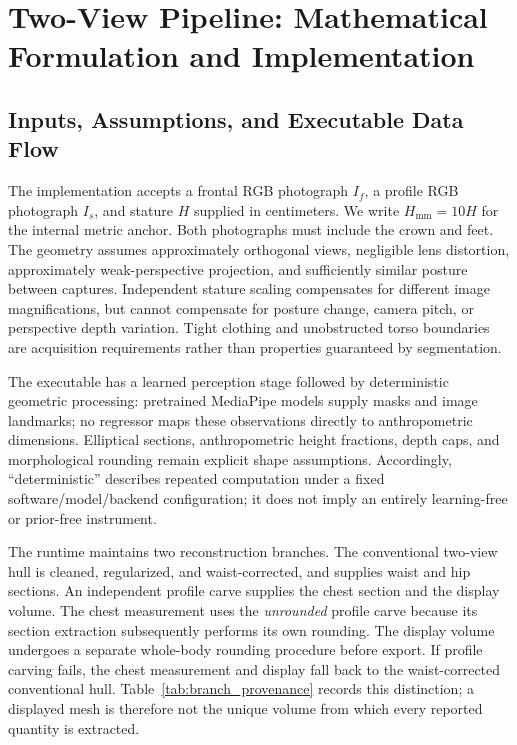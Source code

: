 \section{Two-View Pipeline: Mathematical Formulation and Implementation}
\label{sec:system_pipeline}

\subsection{Inputs, Assumptions, and Executable Data Flow}
The implementation accepts a frontal RGB photograph $I_f$, a profile RGB photograph $I_s$, and stature $H$ supplied in centimeters. We write $H_{\mathrm{mm}}=10H$ for the internal metric anchor. Both photographs must include the crown and feet. The geometry assumes approximately orthogonal views, negligible lens distortion, approximately weak-perspective projection, and sufficiently similar posture between captures. Independent stature scaling compensates for different image magnifications, but cannot compensate for posture change, camera pitch, or perspective depth variation. Tight clothing and unobstructed torso boundaries are acquisition requirements rather than properties guaranteed by segmentation.

The executable has a learned perception stage followed by deterministic geometric processing: pretrained MediaPipe models supply masks and image landmarks; no regressor maps these observations directly to anthropometric dimensions. Elliptical sections, anthropometric height fractions, depth caps, and morphological rounding remain explicit shape assumptions. Accordingly, ``deterministic'' describes repeated computation under a fixed software/model/backend configuration; it does not imply an entirely learning-free or prior-free instrument.

The runtime maintains two reconstruction branches. The conventional two-view hull is cleaned, regularized, and waist-corrected, and supplies waist and hip sections. An independent profile carve supplies the chest section and the display volume. The chest measurement uses the \emph{unrounded} profile carve because its section extraction subsequently performs its own rounding. The display volume undergoes a separate whole-body rounding procedure before export. If profile carving fails, the chest measurement and display fall back to the waist-corrected conventional hull. Table~\ref{tab:branch_provenance} records this distinction; a displayed mesh is therefore not the unique volume from which every reported quantity is extracted.

